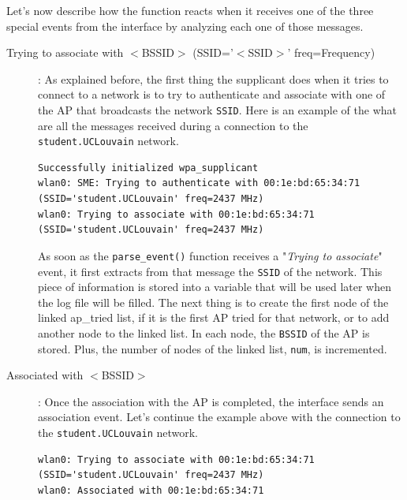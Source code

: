Let's now describe how the function reacts when it receives one of the three special events from the interface by analyzing each one of those messages.

\begin{description}
	\item[Trying to associate with $<$BSSID$>$ (SSID='$<$SSID$>$' freq=Frequency)]:
		As explained before, the first thing the supplicant does when it tries to connect to a network is to try to authenticate and associate with one of the AP that broadcasts the network \texttt{SSID}. Here is an example of the what are all the messages received during a connection to the \texttt{student.UCLouvain} network.\\

\begin{lstlisting}[frame=single,breaklines=true,caption={Example of a connection to the \texttt{student.UCLouvain} network - 1}]
Successfully initialized wpa_supplicant
wlan0: SME: Trying to authenticate with 00:1e:bd:65:34:71 (SSID='student.UCLouvain' freq=2437 MHz)
wlan0: Trying to associate with 00:1e:bd:65:34:71 (SSID='student.UCLouvain' freq=2437 MHz)
\end{lstlisting}

	As soon as the \texttt{parse\_event()} function receives a "\textit{Trying to associate}" event, it first extracts from that message the \texttt{SSID} of the network. This piece of information is stored into a variable that will be used later when the log file will be filled. The next thing is to create the first node of the linked ap\_tried list, if it is the first AP tried for that network, or to add another node to the linked list. In each node, the \texttt{BSSID} of the AP is stored. Plus, the number of nodes of the linked list, \texttt{num}, is incremented.

	\item[Associated with $<$BSSID$>$]:
	Once the association with the AP is completed, the interface sends an association event. Let's continue the example above with the connection to the \texttt{student.UCLouvain} network.\\

\begin{lstlisting}[frame=single,breaklines=true,caption={Example of a connection to the \texttt{student.UCLouvain} network - 2}]
wlan0: Trying to associate with 00:1e:bd:65:34:71 (SSID='student.UCLouvain' freq=2437 MHz)
wlan0: Associated with 00:1e:bd:65:34:71
\end{lstlisting}


\end{description}
